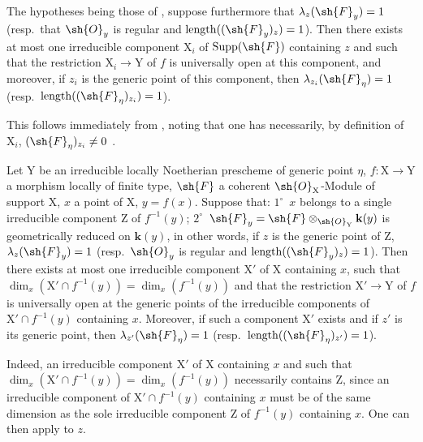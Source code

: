 \begin{corollary}[15.1.2]
\label{IV.15.1.2}
The hypotheses being those of , suppose furthermore that $\lambda_z(\sh{F}_y)=1$ (resp.~that $\sh{O}_y$ is regular and $\operatorname{length}((\sh{F}_y)_z)=1$).
Then there exists at most one irreducible component $\mathrm{X}_i$ of $\operatorname{Supp}(\sh{F})$ containing $z$ and such that the restriction $\mathrm{X}_i\to\mathrm{Y}$ of $f$ is universally open at this component, and moreover, if $z_i$ is the generic point of this component, then $\lambda_{z_i}(\sh{F}_\eta)=1$ (resp.~$\operatorname{length}((\sh{F}_\eta)_{z_i})=1$).
\end{corollary}

This follows immediately from , noting that one has necessarily, by definition of $\mathrm{X}_i$, $(\sh{F}_\eta)_{z_i}\neq 0$ .

\begin{corollary}[15.1.3]
\label{IV.15.1.3}
Let $\mathrm{Y}$ be an irreducible locally Noetherian prescheme of generic point $\eta$, $f:\mathrm{X}\to\mathrm{Y}$ a morphism locally of finite type, $\sh{F}$ a coherent $\sh{O}_\mathrm{X}$-Module of support $\mathrm{X}$, $x$ a point of $\mathrm{X}$, $y=f(x)$.
Suppose that: $1^\circ$~$x$ belongs to a single irreducible component $\mathrm{Z}$ of $f^{-1}(y)$; $2^\circ$~$\sh{F}_y=\sh{F}\otimes_{\sh{O}_\mathrm{Y}}\mathbf{k}(y)$ is geometrically reduced on $\mathbf{k}(y)$, in other words, if $z$ is the generic point of $\mathrm{Z}$, $\lambda_z(\sh{F}_y)=1$ (resp.~$\sh{O}_y$ is regular and $\operatorname{length}((\sh{F}_y)_z)=1$).
Then there exists at most one irreducible component $\mathrm{X}'$ of $\mathrm{X}$ containing $x$, such that $\dim_x(\mathrm{X}'\cap f^{-1}(y))=\dim_x(f^{-1}(y))$ and that the restriction $\mathrm{X}'\to\mathrm{Y}$ of $f$ is universally open at the generic points of the irreducible components of $\mathrm{X}'\cap f^{-1}(y)$ containing $x$.
Moreover, if such a component $\mathrm{X}'$ exists and if $z'$ is its generic point, then $\lambda_{z'}(\sh{F}_\eta)=1$ (resp.~$\operatorname{length}((\sh{F}_\eta)_{z'})=1$).
\end{corollary}

Indeed, an irreducible component $\mathrm{X}'$ of $\mathrm{X}$ containing $x$ and such that $\dim_x(\mathrm{X}'\cap f^{-1}(y))=\dim_x(f^{-1}(y))$ necessarily contains $\mathrm{Z}$, since an irreducible component of $\mathrm{X}'\cap f^{-1}(y)$ containing $x$ must be of the same dimension as the sole irreducible component $\mathrm{Z}$ of $f^{-1}(y)$ containing $x$.
One can then apply  to $z$.

